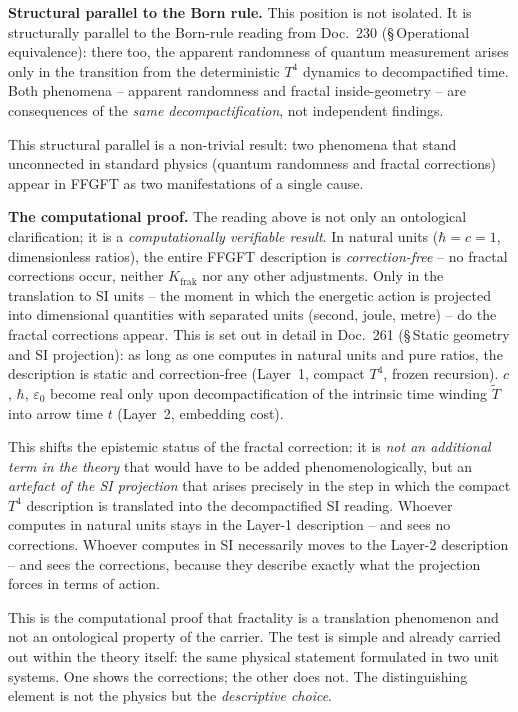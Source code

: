 \textbf{Structural parallel to the Born rule.} This position is not
isolated. It is structurally parallel to the Born-rule reading from
Doc.~230 (§\,Operational equivalence): there too, the apparent
randomness of quantum measurement arises only in the transition from
the deterministic $T^4$ dynamics to decompactified time. Both
phenomena -- apparent randomness and fractal inside-geometry -- are
consequences of the \emph{same decompactification}, not independent
findings.

This structural parallel is a non-trivial result: two phenomena that
stand unconnected in standard physics (quantum randomness and
fractal corrections) appear in FFGFT as two manifestations of a
single cause.

\textbf{The computational proof.} The reading above is not only an
ontological clarification; it is a \emph{computationally verifiable
result}. In natural units ($\hbar = c = 1$, dimensionless ratios),
the entire FFGFT description is \emph{correction-free} -- no fractal
corrections occur, neither $K_{\text{frak}}$ nor any other
adjustments. Only in the translation to SI units -- the moment in
which the energetic action is projected into dimensional quantities
with separated units (second, joule, metre) -- do the fractal
corrections appear. This is set out in detail in Doc.~261
(§\,Static geometry and SI projection): as long as one computes in
natural units and pure ratios, the description is static and
correction-free (Layer~1, compact $T^4$, frozen recursion). $c$,
$\hbar$, $\varepsilon_0$ become real only upon decompactification of
the intrinsic time winding $\tilde T$ into arrow time $t$
(Layer~2, embedding cost).

This shifts the epistemic status of the fractal correction: it is
\emph{not an additional term in the theory} that would have to be
added phenomenologically, but an \emph{artefact of the SI
projection} that arises precisely in the step in which the compact
$T^4$ description is translated into the decompactified SI
reading. Whoever computes in natural units stays in the Layer-1
description -- and sees no corrections. Whoever computes in SI
necessarily moves to the Layer-2 description -- and sees the
corrections, because they describe exactly what the projection
forces in terms of action.

This is the computational proof that fractality is a translation
phenomenon and not an ontological property of the carrier. The test
is simple and already carried out within the theory itself: the
same physical statement formulated in two unit systems. One shows
the corrections; the other does not. The distinguishing element is
not the physics but the \emph{descriptive choice}.

